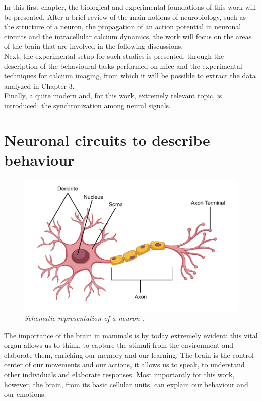 \documentclass[12pt, a4paper]{report}
\begin{document}
	
	In this first chapter, the biological and experimental foundations of this work will be presented. After a brief review of the main notions of neurobiology, such as the structure of a neuron, the propagation of an action potential in neuronal circuits and the intracellular calcium dynamics, the work will focus on the areas of the brain that are involved in the following discussions.\\
	Next, the experimental setup for such studies is presented, through the description of the behavioural tasks performed on mice and the experimental techniques for calcium imaging, from which it will be possible to extract the data analyzed in Chapter 3.\\
	Finally, a quite modern and, for this work, extremely relevant topic, is introduced: the synchronization among neural signals.
	
	\section{Neuronal circuits to describe behaviour} \label{first section}
	
	\begin{figure}[H]
		\begin{center}
			\includegraphics[scale=.25]{neuron.png} 
		\end{center} 
		\caption{\textit{Schematic representation of a neuron \cite{42}.}} \label{neuron}
		
	\end{figure}
	
	The importance of the brain in mammals is by today extremely evident: this vital organ allows us to think,  to capture the stimuli from the environment and elaborate them, enriching our memory and  our learning. The brain is the control center of our movements and our actions, it allows us to speak, to understand other individuals and elaborate responses. Most importantly for this work, however, the brain, from its basic cellular units, can explain our behaviour and our emotions. \\
\end{document}
